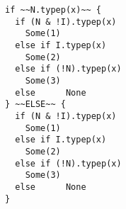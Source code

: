 \begin{lstlisting}[style=reclojureScala]
if ~~N.typep(x)~~ {
  if (N & !I).typep(x)
    Some(1)
  else if I.typep(x)
    Some(2)
  else if (!N).typep(x)
    Some(3)
  else      None
} ~~ELSE~~ {
  if (N & !I).typep(x)
    Some(1)
  else if I.typep(x)
    Some(2)
  else if (!N).typep(x)
    Some(3)
  else      None
}
\end{lstlisting}

